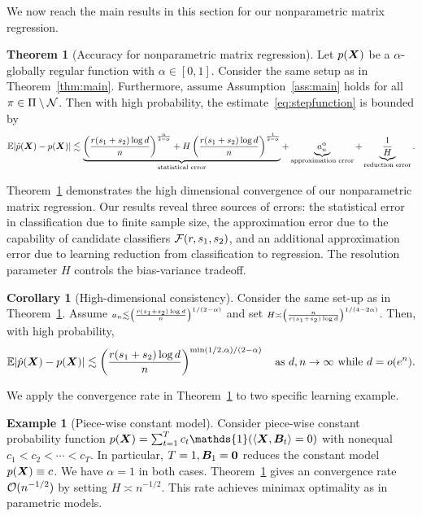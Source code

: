 \documentclass[11pt]{article}
\newcommand*{\KeepStyleUnderBrace}[1]{%
\mathop{%
\mathchoice
{\underbrace{\displaystyle#1}}%
{\underbrace{\textstyle#1}}%
{\underbrace{\scriptstyle#1}}%
{\underbrace{\scriptscriptstyle#1}}%
}\limits
}
\theoremstyle{definition}
\newtheorem{thm}{Theorem}[section]
\newtheorem{corollary}{Corollary}[section]
\newtheorem{example}{Example}
\begin{document}
We now reach the main results in this section for our nonparametric matrix regression. 

\begin{thm}[Accuracy for nonparametric matrix regression]\label{thm:regression} Let $p(\bm X)$ be a $\alpha$-globally regular function with $\alpha\in[0,1]$. Consider the same setup as in Theorem~\ref{thm:main}. Furthermore, assume Assumption~\ref{ass:main} holds for all $\pi\in\Pi\setminus \mathcal{N}$. Then with high probability, the estimate~\eqref{eq:stepfunction} is bounded by
\[
\mathbb{E}|\hat p(\mX)- p(\mX)| \lesssim  \KeepStyleUnderBrace{
\left({r(s_1+s_2)\log d\over n}\right)^{\alpha\over 2-\alpha}+H\left({r(s_1+s_2)\log d\over n}\right)^{1\over 2-\alpha}}_{\text{statistical error}} + \KeepStyleUnderBrace{a^\alpha_n}_{\text{approximation error}}+\KeepStyleUnderBrace{{1\over H}}_{\text{reduction error}}.
\]
\end{thm}

Theorem~\ref{thm:regression} demonstrates the high dimensional convergence of our nonparametric matrix regression. Our results reveal three sources of errors: the statistical error in classification due to finite sample size, the approximation error due to the capability of candidate classifiers $\mathcal{F}(r,s_1,s_2)$, and an additional approximation error due to learning reduction from classification to regression. The resolution parameter $H$ controls the bias-variance tradeoff. 

\begin{corollary}[High-dimensional consistency] Consider the same set-up as in Theorem~\ref{thm:regression}. Assume $\scriptstyle a_n \lesssim \left({r(s_1+s_2)\log d \over n}\right)^{1/(2-\alpha)}$ and set $\scriptstyle H\asymp \left({n\over r(s_1+s_2) \log d}\right)^{1/(4-2\alpha)}$. Then, with high probability,
\begin{equation}\label{eq:final}
\mathbb{E}|\hat p(\bm X)- p(\bm X)| \lesssim \left({r(s_1+s_2)\log d \over n}\right)^{\min(1/2,\alpha)/(2-\alpha)} \quad \text{as }d, n\to\infty \text{ while } d=o(e^{n}).
\end{equation}
\end{corollary}

We apply the convergence rate in Theorem~\ref{thm:regression} to two specific learning example.
\begin{example}[Piece-wise constant model] Consider piece-wise constant probability function $p(\mX)=\sum_{t=1}^T c_t\mathds{1}(\langle \mX, \mB_t \rangle=0)$ with nonequal $c_1< c_2<\cdots < c_T$. In particular, $T=1, \bm B_1=\bm{0}$ reduces the constant model $p(\bm X)\equiv c$. We have $\alpha=1$ in both cases. Theorem~\ref{thm:regression} gives an convergence rate $\mathcal{O}(n^{-1/2})$ by setting $H\asymp n^{-1/2}$. This rate achieves minimax optimality as in parametric models. 
\end{example}
\end{document}
